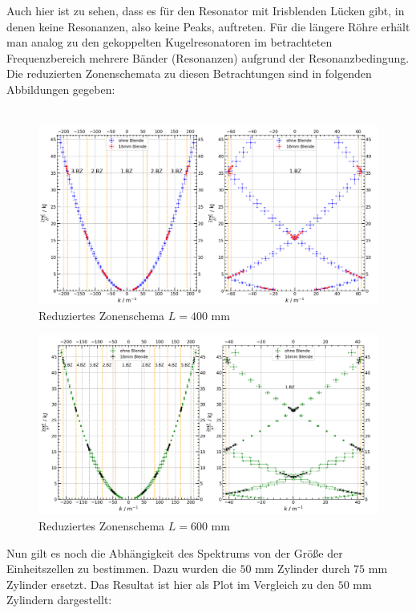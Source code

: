 \documentclass[german,  %
parskip=full,  %
]{scrartcl}
\begin{document}
Auch hier ist zu sehen, dass es für den Resonator mit Irisblenden Lücken gibt, in denen keine Resonanzen, also keine Peaks, auftreten. Für die längere Röhre erhält man analog zu den gekoppelten Kugelresonatoren im betrachteten Frequenzbereich mehrere Bänder (Resonanzen) aufgrund der Resonanzbedingung.
\newline Die reduzierten Zonenschemata zu diesen Betrachtungen sind in folgenden Abbildungen gegeben:
\\\\
\begin{figure}[h!]
\centering
\includegraphics[width=\textwidth]{4614_400mm_reduziertes_Zonenschema.png}
\caption{Reduziertes Zonenschema $L=400$ mm}
\end{figure}
\newpage
\begin{figure}[h!]
\centering
\includegraphics[width=\textwidth]{4615_600mm_reduziertes_Zonenschema.png}
\caption{Reduziertes Zonenschema $L=600$ mm}
\end{figure}
Nun gilt es noch die Abhängigkeit des Spektrums von der Größe der Einheitszellen zu bestimmen. Dazu wurden die $50$ mm Zylinder durch $75$ mm Zylinder ersetzt. Das Resultat ist hier als Plot im Vergleich zu den $50$ mm Zylindern dargestellt:
\end{document}

